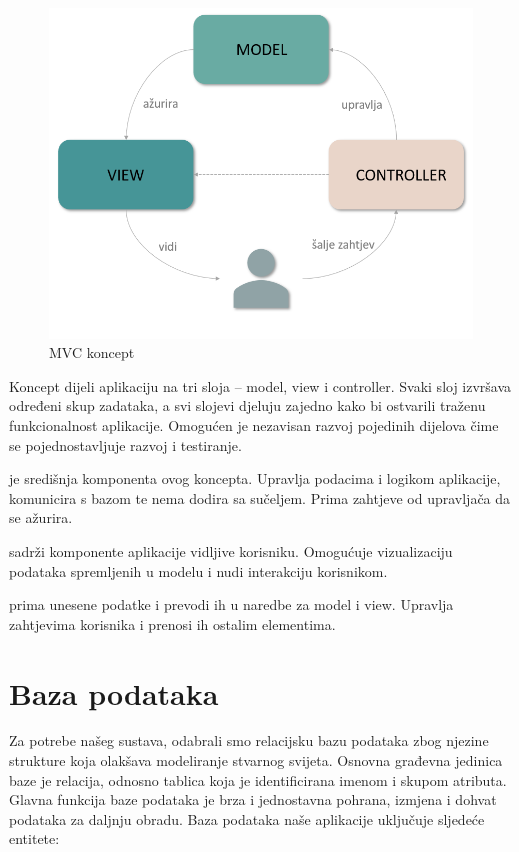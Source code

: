 		\begin{figure}[H]
			\includegraphics[scale=0.75]{slike/mvc.PNG} %
			\centering
			\caption{MVC koncept}
			\label{fig:mvcSkica}
		\end{figure}

		Koncept dijeli aplikaciju na tri sloja – model, view i controller. Svaki sloj izvršava određeni skup zadataka, a svi slojevi djeluju zajedno kako bi ostvarili traženu funkcionalnost aplikacije. Omogućen je nezavisan razvoj pojedinih dijelova čime se pojednostavljuje razvoj i testiranje. 

		 je središnja komponenta ovog koncepta. Upravlja podacima i logikom aplikacije, komunicira s bazom te nema dodira sa sučeljem. Prima zahtjeve od upravljača da se ažurira.

		 sadrži komponente aplikacije vidljive korisniku. Omogućuje vizualizaciju podataka spremljenih u modelu i nudi interakciju  korisnikom.

		  prima unesene podatke i prevodi ih u naredbe za model i view. Upravlja zahtjevima korisnika i prenosi ih ostalim elementima.
				
		\section{Baza podataka}
			
		 Za potrebe našeg sustava, odabrali smo relacijsku bazu podataka zbog njezine strukture koja olakšava modeliranje stvarnog svijeta. Osnovna građevna jedinica baze je relacija, odnosno tablica koja je identificirana imenom i skupom atributa. Glavna funkcija baze podataka je brza i jednostavna pohrana, izmjena i dohvat podataka za daljnju obradu. Baza podataka naše aplikacije uključuje sljedeće entitete:
		
